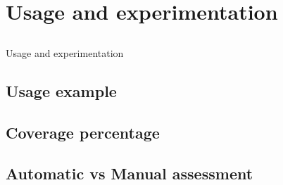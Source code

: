 \chapter{Usage and experimentation} \label{chap:usage}

\section*{}

Usage and experimentation

\section{Usage example} \label{sec:usageexample}


\section{Coverage percentage} \label{sec:coverage}
	
\section{Automatic vs Manual assessment} \label{sec:automatic}
